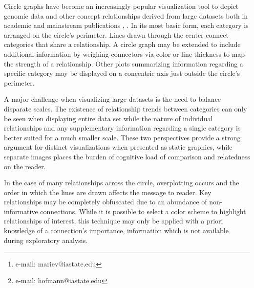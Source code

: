 \documentclass{vgtc}                          %
\title{}
\author{Marie Vendettuoli\thanks{e-mail: mariev@iastate.edu} %
\and Heike Hofmann\thanks{e-mail: hofmann@iastate.edu}\\
\scriptsize Department of Statistics }%
\affiliation{\scriptsize Human Computer Interaction Program \\ Bioinformatics and Computational Biology Program \\ Iowa State University}
\begin{document}


\maketitle

Circle graphs have become an increasingly popular visualization tool to depict genomic data and other concept relationships derived from large datasets both in academic and mainstream publications \cite{aumann99}, \cite{krzywinski09}. In its most basic form, each category is arranged on the circle’s perimeter. Lines drawn through the center connect categories that share a relationship.  A circle graph may be extended to include additional information by weighing connectors via color or line thickness to map the strength of a relationship. Other plots summarizing information regarding a specific category may be displayed on a concentric axis just outside the circle’s perimeter.

A major challenge when visualizing large datasets is the need to balance disparate scales. The existence of relationship trends between categories can only be seen when displaying entire data set while the nature of individual relationships and any supplementary information regarding a single category is better suited for a much smaller scale. These two perspectives provide a strong argument for distinct visualizations when presented as static graphics, while separate images places the burden of cognitive load of comparison and relatedness on the reader. 

In the case of many relationships across the circle, overplotting occurs and the order in which the lines are drawn affects the message to reader. Key relationships may be completely obfuscated due to an abundance of non-informative connections. While it is possible to select a color scheme to highlight relationships of interest, this technique may only be applied with a priori knowledge of a connection’s importance, information which is not available during exploratory analysis.
\end{document}
